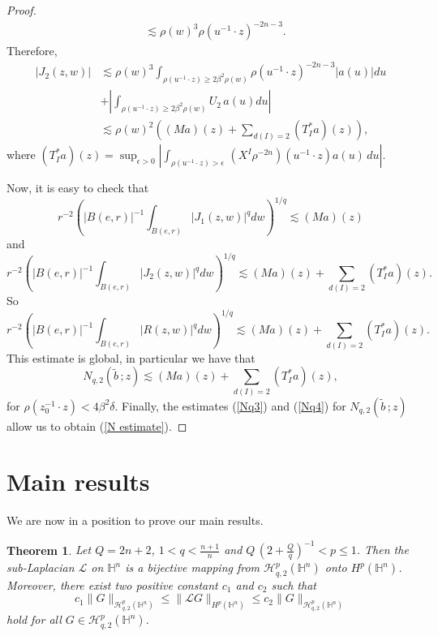 \documentclass[reqno,10pt]{article}
\newtheorem{theorem}{Theorem}
\theoremstyle{definition}
\numberwithin{equation}{section}
\numberwithin{theorem}{section}
\begin{document}
\begin{proof}
\begin{equation*}
\begin{split}
& \lesssim \rho(w)^3 \rho(u^{-1} \cdot z)^{-2n-3}.
\end{split}
\end{equation*}
Therefore,
\begin{equation*}
\begin{split}
|J_2(z, w)| & \lesssim \rho(w)^{3} \int_{\rho(u^{-1} \cdot z) \geq 2 \beta^2 \rho(w)} \rho(u^{-1} \cdot z)^{-2n-3} |a(u)| du \\
& + \left| \int_{\rho(u^{-1} \cdot z) \geq 2 \beta^2 \rho(w)} U_2 \, a(u) du \right| \\
& \lesssim \rho(w)^{2} \left( (Ma)(z) + \sum_{d(I)=2} (T_{I}^{\ast}a)(z) \right),
\end{split}
\end{equation*}
where $(T_{I}^{\ast}a)(z) = \sup_{\epsilon >0} \left|\int_{\rho(u^{-1} \cdot z)> \epsilon} \, (X^I \rho^{-2n})(u^{-1} \cdot z) a(u) \, du\right|$.

Now, it is easy to check that 
\[
r^{-2} \left( |B(e, r)|^{-1} \int_{B(e, r)} |J_1(z, w)|^{q} dw \right)^{1/q} \lesssim (Ma)(z)
\]
and
\[
r^{-2} \left( |B(e, r)|^{-1} \int_{B(e, r)} |J_2(z,w)|^{q} dw \right)^{1/q} \lesssim (Ma)(z) + \sum_{d(I)=2} (T^{*}_{I}a)(z).
\]
So
\[
r^{-2} \left( |B(e, r)|^{-1} \int_{B(e, r)} |R(z,w)|^{q} dw \right)^{1/q} \lesssim (Ma)(z) + \sum_{d(I)=2} (T^{*}_{I}a)(z).
\]
This estimate is global, in particular we have that
\begin{equation}
N_{q,2} \left(\widetilde{b} \, ; z \right) \lesssim (Ma)(z) + \sum_{d(I)=2} (T^{*}_{I}a)(z), \label{Nq4}
\end{equation}
for $\rho(z_0^{-1} \cdot z) < 4 \beta^2 \delta$. Finally, the estimates (\ref{Nq3}) and (\ref{Nq4}) for 
$N_{q,2} \left(\widetilde{b} \, ; z \right)$ allow us to obtain (\ref{N estimate}).
\end{proof}

\section{Main results}

We are now in a position to prove our main results.

\begin{theorem} \label{principal thm} Let $Q=2n+2$, $1 < q < \frac{n+1}{n}$ and $Q \, (2 + \frac{Q}{q})^{-1} < p \leq 1$. Then 
the sub-Laplacian $\mathcal{L}$ on $\mathbb{H}^n$ is a bijective mapping from $\mathcal{H}^{p}_{q, 2}(\mathbb{H}^{n})$ onto 
$H^{p}(\mathbb{H}^{n})$. Moreover, there exist two positive constant $c_1$ and $c_2$ such that
\begin{equation} \label{doble ineq}
c_1 \|G \|_{\mathcal{H}^{p}_{q, 2}(\mathbb{H}^{n})} \leq \| \mathcal{L}G \|_{H^{p}(\mathbb{H}^{n})} \leq 
c_2 \|G \|_{\mathcal{H}^{p}_{q, 2}(\mathbb{H}^{n})}
\end{equation}
hold for all $G \in \mathcal{H}^{p}_{q, 2}(\mathbb{H}^{n})$.
\end{theorem}
\end{document}
